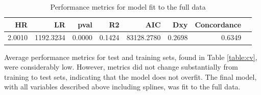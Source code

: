 \documentclass{article}
\begin{document}
\begin{table}[ht]
\centering
\caption{Performance metrics for model fit to the full data} 
\begin{tabular}{rrrrrrrr}
  \hline
  HR & LR & pval & R2 & AIC & Dxy & Concordance \\ 
  \hline
  2.0010 & 1192.3234 & 0.0000 & 0.1424 & 83128.2780 & 0.2698 & 0.6349 \\ 
   \hline
\end{tabular}
\label{table:finalmetrics}
\end{table}

Average performance metrics for test and training sets, found in Table \ref{table:cv}, were considerably low. However, metrics did not change substantially from training to test sets, indicating that the model does not overfit. The final model, with all variables described above including splines, was fit to the full data.
\end{document}
